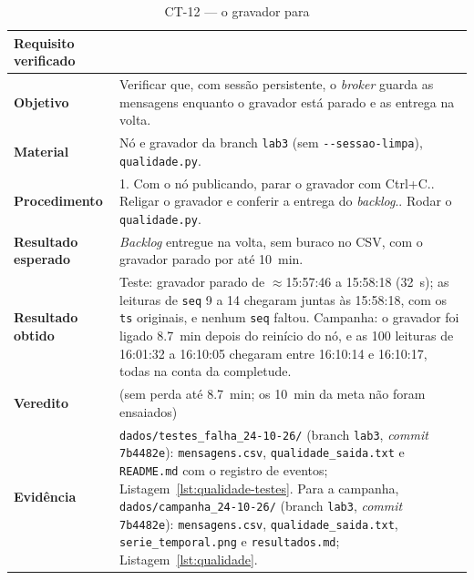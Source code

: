 \begin{table}[H]
\centering
\caption{CT-12 --- o gravador para}
\label{tab:ct12}
\footnotesize
\setlength{\tabcolsep}{3.5pt}
\begin{tabular}{@{}L{3.2cm}L{12.0cm}@{}}
\toprule
\textbf{Requisito verificado} &  \\
\midrule
\textbf{Objetivo} & Verificar que, com sessão persistente, o \emph{broker} guarda as mensagens enquanto o gravador está parado e as entrega na volta. \\
\textbf{Material} & Nó e gravador da branch \texttt{lab3} (sem \texttt{-{}-sessao-limpa}), \texttt{qualidade.py}. \\
\textbf{Procedimento} &
  1. Com o nó publicando, parar o gravador com Ctrl+C.. Religar o gravador e conferir a entrega do \emph{backlog}.. Rodar o \texttt{qualidade.py}. \\
\textbf{Resultado esperado} & \emph{Backlog} entregue na volta, sem buraco no CSV, com o gravador parado por até \SI{10}{\minute}. \\
\textbf{Resultado obtido} & Teste: gravador parado de $\approx$15:57:46 a 15:58:18 (\SI{32}{\second}); as leituras de \texttt{seq} 9 a 14 chegaram juntas às 15:58:18, com os \texttt{ts} originais, e nenhum \texttt{seq} faltou. Campanha: o gravador foi ligado \SI{8,7}{\minute} depois do reinício do nó, e as 100 leituras de 16:01:32 a 16:10:05 chegaram entre 16:10:14 e 16:10:17, todas na conta da completude. \\
\textbf{Veredito} & \parcial{} (sem perda até \SI{8,7}{\minute}; os \SI{10}{\minute} da meta não foram ensaiados) \\
\textbf{Evidência} & \texttt{dados/testes\_falha\_24-10-26/} (branch \texttt{lab3}, \emph{commit} \texttt{7b4482e}): \texttt{mensagens.csv}, \texttt{qualidade\_saida.txt} e \texttt{README.md} com o registro de eventos; Listagem~\ref{lst:qualidade-testes}. Para a campanha, \texttt{dados/campanha\_24-10-26/} (branch \texttt{lab3}, \emph{commit} \texttt{7b4482e}): \texttt{mensagens.csv}, \texttt{qualidade\_saida.txt}, \texttt{serie\_temporal.png} e \texttt{resultados.md}; Listagem~\ref{lst:qualidade}. \\
\bottomrule
\end{tabular}
\end{table}

